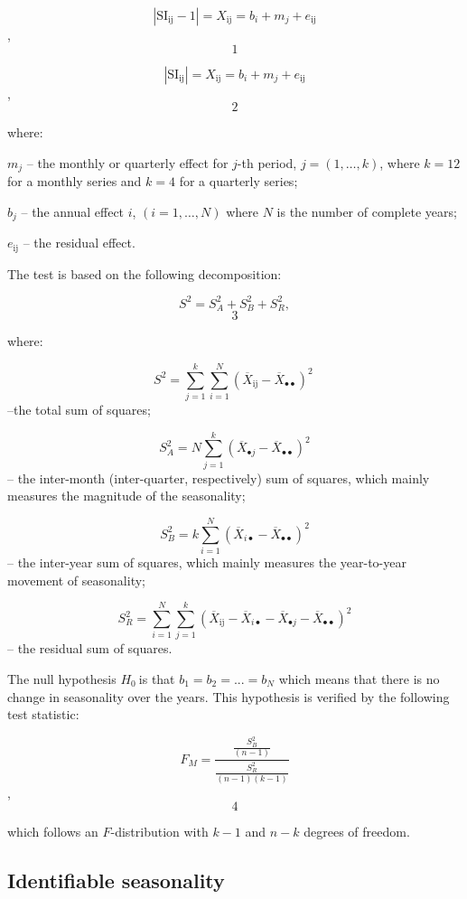 \documentclass[
]{book}
\begin{document}
\[
  \left|\text{SI}_{\text{ij}} - 1 \right| = X_{\text{ij}} = b_{i} + m_{j} + e_{\text{ij}}
  \], \[1\]

\[
  \left| \text{SI}_{\text{ij}} \right| = X_{\text{ij}} = b_{i} + m_{j} + e_{\text{ij}}
  \], \[2\]

where:

\(m_{j}\) -- the monthly or quarterly effect for \(j\)-th period,
\(j = (1,\ldots,k)\), where \(k = 12\) for a monthly series and \(k = 4\) for
a quarterly series;

\(b_{j}\) -- the annual effect \(i\), \((i = 1,\ldots,N)\) where \(N\) is the
number of complete years;

\(e_{\text{ij}}\) -- the residual effect.

The test is based on the following decomposition:

\[S^{2} = S_{A}^{2} + S_{B}^{2} + S_{R}^{2},\] \[3\]

where:

\[
S^{2} = \sum_{j = 1}^{k}{\sum_{i = 1}^{N}\left( {\overline{X}}_{\text{ij}} - {\overline{X}}_{\bullet \bullet} \right)^{2}}\ 
\] --the total sum of squares;

\[
S_{A}^{2} = N\sum_{j = 1}^{k}\left( {\overline{X}}_{\bullet j} - {\overline{X}}_{\bullet \bullet} \right)^{2}
\] -- the inter-month (inter-quarter, respectively) sum of squares, which
mainly measures the magnitude of the seasonality;

\[
S_{B}^{2} = k\sum_{i = 1}^{N}\left( {\overline{X}}_{i \bullet} - {\overline{X}}_{\bullet \bullet} \right)^{2}
\] -- the inter-year sum of squares, which mainly measures the year-to-year
movement of seasonality;

\[
S_{R}^{2} = \sum_{i = 1}^{N}{\sum_{j = 1}^{k}\left( {\overline{X}}_{\text{ij}} - {\overline{X}}_{i \bullet} - {\overline{X}}_{\bullet j} - {\overline{X}}_{\bullet \bullet} \right)^{2}}
\] -- the residual sum of squares.

The null hypothesis \(H_{0}\ \)is that \(b_{1} = b_{2} = ... = b_{N}\) which
means that there is no change in seasonality over the years. This
hypothesis is verified by the following test statistic:

\[
   F_{M} = \frac{\frac{S_{B}^{2}}{(n - 1)}}{\frac{S_{R}^{2}}{(n - 1)(k - 1)}}
   \], \[4\]

which follows an \(F\)-distribution with \(k - 1\) and \(n - k\) degrees of
freedom.

\hypertarget{identifiable-seasonality}{%
\subsection{Identifiable seasonality}\label{identifiable-seasonality}}
\end{document}
